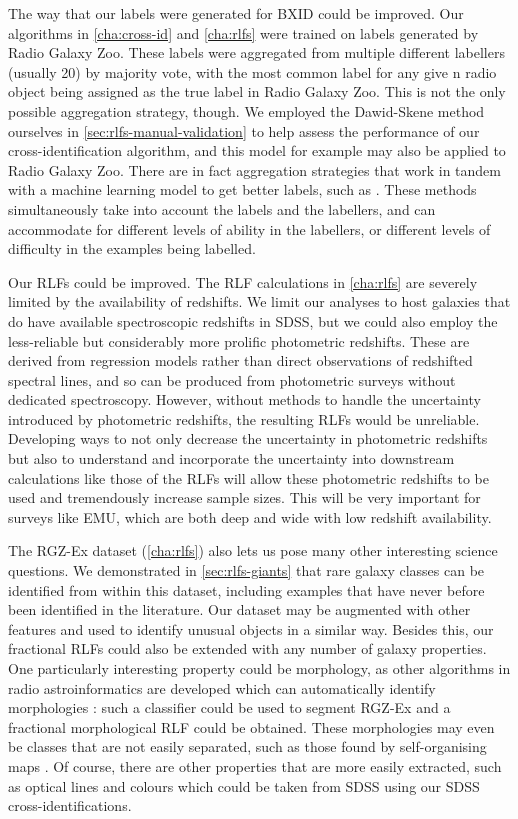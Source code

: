     The way that our labels were generated for BXID could be improved. Our algorithms in \autoref{cha:cross-id} and \autoref{cha:rlfs} were trained on labels generated by Radio Galaxy Zoo. These labels were aggregated from multiple different labellers (usually 20) by majority vote, with the most common label for any give n radio object being assigned as the true label in Radio Galaxy Zoo. This is not the only possible aggregation strategy, though. We employed the Dawid-Skene method \citep{dawid79em} ourselves in \autoref{sec:rlfs-manual-validation} to help assess the performance of our cross-identification algorithm, and this model for example may also be applied to Radio Galaxy Zoo. There are in fact aggregation strategies that work in tandem with a machine learning model to get better labels, such as \citet{raykar_learning_2010}. These methods simultaneously take into account the labels and the labellers, and can accommodate for different levels of ability in the labellers, or different levels of difficulty in the examples being labelled.

    Our RLFs could be improved. The RLF calculations in \autoref{cha:rlfs} are severely limited by the availability of redshifts. We limit our analyses to host galaxies that do have available spectroscopic redshifts in SDSS, but we could also employ the less-reliable but considerably more prolific photometric redshifts. These are derived from regression models rather than direct observations of redshifted spectral lines, and so can be produced from photometric surveys without dedicated spectroscopy. However, without methods to handle the uncertainty introduced by photometric redshifts, the resulting RLFs would be unreliable. Developing ways to not only decrease the uncertainty in photometric redshifts but also to understand and incorporate the uncertainty into downstream calculations like those of the RLFs will allow these photometric redshifts to be used and tremendously increase sample sizes. This will be very important for surveys like EMU, which are both deep and wide with low redshift availability.

    The RGZ-Ex dataset (\autoref{cha:rlfs}) also lets us pose many other interesting science questions. We demonstrated in \autoref{sec:rlfs-giants} that rare galaxy classes can be identified from within this dataset, including examples that have never before been identified in the literature. Our dataset may be augmented with other features and used to identify unusual objects in a similar way. Besides this, our fractional RLFs could also be extended with any number of galaxy properties. One particularly interesting property could be morphology, as other algorithms in radio astroinformatics are developed which can automatically identify morphologies \citep[e.g.][]{wu19claran}: such a classifier could be used to segment RGZ-Ex and a fractional morphological RLF could be obtained. These morphologies may even be classes that are not easily separated, such as those found by self-organising maps \citep[e.g.][]{polsterer15pink}. Of course, there are other properties that are more easily extracted, such as optical lines and colours which could be taken from SDSS using our SDSS cross-identifications.

